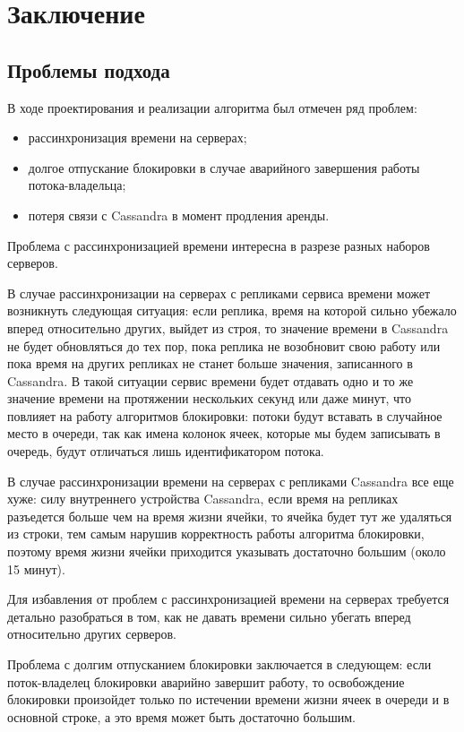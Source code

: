 \section{Заключение}

\subsection{Проблемы подхода}

В ходе проектирования и реализации алгоритма был отмечен ряд проблем:

\begin{itemize}
	\item рассинхронизация времени на серверах;
	\item долгое отпускание блокировки в случае аварийного завершения работы потока-владельца;
	\item потеря связи с Cassandra в момент продления аренды.
\end{itemize}

Проблема с рассинхронизацией времени интересна в разрезе разных наборов серверов.

В случае рассинхронизации на серверах с репликами сервиса времени может возникнуть следующая ситуация: если реплика, время на которой сильно убежало вперед относительно других, выйдет из строя, то значение времени в Cassandra не будет обновляться до тех пор, пока реплика не возобновит свою работу или пока время на других репликах не станет больше значения, записанного в Cassandra. В такой ситуации сервис времени будет отдавать одно и то же значение времени на протяжении нескольких секунд или даже минут, что повлияет на работу алгоритмов блокировки: потоки будут вставать в случайное место в очереди, так как имена колонок ячеек, которые мы будем записывать в очередь, будут отличаться лишь идентификатором потока.

В случае рассинхронизации времени на серверах с репликами Cassandra все еще хуже: силу внутреннего устройства Cassandra, если время на репликах разъедется больше чем на время жизни ячейки, то ячейка будет тут же удаляться из строки, тем самым нарушив корректность работы алгоритма блокировки, поэтому время жизни ячейки приходится указывать достаточно большим (около 15 минут).

Для избавления от проблем с рассинхронизацией времени на серверах требуется детально разобраться в том, как не давать времени сильно убегать вперед относительно других серверов.

Проблема с долгим отпусканием блокировки заключается в следующем: если поток-владелец блокировки аварийно завершит работу, то освобождение блокировки произойдет только по истечении времени жизни ячеек в очереди и в основной строке, а это время может быть достаточно большим.

